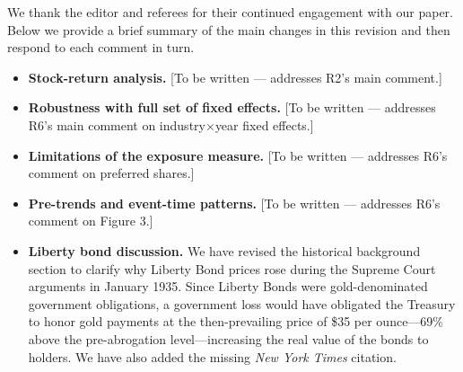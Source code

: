 \noindent We thank the editor and referees for their continued engagement with our paper. Below we provide a brief summary of the main changes in this revision and then respond to each comment in turn.

\begin{itemize}
\item \textbf{Stock-return analysis.} [To be written --- addresses R2's main comment.]
\item \textbf{Robustness with full set of fixed effects.} [To be written --- addresses R6's main comment on industry$\times$year fixed effects.]
\item \textbf{Limitations of the exposure measure.} [To be written --- addresses R6's comment on preferred shares.]
\item \textbf{Pre-trends and event-time patterns.} [To be written --- addresses R6's comment on Figure 3.]
\item \textbf{Liberty bond discussion.} We have revised the historical background section to clarify why Liberty Bond prices rose during the Supreme Court arguments in January 1935. Since Liberty Bonds were gold-denominated government obligations, a government loss would have obligated the Treasury to honor gold payments at the then-prevailing price of \$35 per ounce---69\% above the pre-abrogation level---increasing the real value of the bonds to holders. We have also added the missing \textit{New York Times} citation.
\end{itemize}
